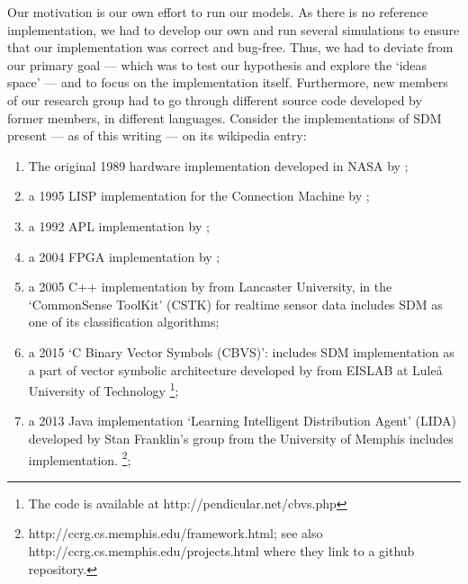 Our motivation is our own effort to run our models. As there is no reference implementation, we had to develop our own and run several simulations to ensure that our implementation was correct and bug-free. Thus, we had to deviate from our primary goal --- which was to test our hypothesis and explore the `ideas space' --- and to focus on the implementation itself. Furthermore, new members of our research group had to go through different source code developed by former members, in different languages.  Consider the implementations of SDM present --- as of this writing --- on its wikipedia entry\citep{noauthor_sparse_2018}:

\begin{enumerate}
    \item The original 1989 hardware implementation developed in NASA by \citet{flynn_sparse_1989};

    \item a 1995 LISP implementation for the Connection Machine by \citet{turk_kanervas_1995};

    \item a 1992 APL implementation by \citet{surkan_wsdm:_1992};

    \item a 2004 FPGA implementation by \citet{silva_reconfigurable_2004};

    \item a 2005 C++ implementation by \citet{berchtold_processing_2005} from Lancaster University, in the `CommonSense ToolKit' (CSTK) \citep{noauthor_cstk:_nodate} for realtime sensor data includes SDM as one of its classification algorithms;

    \item  a 2015 `C Binary Vector Symbols (CBVS)':  includes SDM implementation as a part of  vector symbolic architecture developed by \citet{emruli_vector_2015} from EISLAB at Luleå University of Technology \footnote{The code is available at http://pendicular.net/cbvs.php};

    \item a 2013 Java implementation `Learning Intelligent Distribution Agent' (LIDA) developed by \citep{franklin_lida:_2014, snaider_integer_2013, snaider_modular_2014} Stan Franklin's group from the University of Memphis includes implementation. \footnote{http://ccrg.cs.memphis.edu/framework.html; see also http://ccrg.cs.memphis.edu/projects.html where they link to a github repository.};

\end{enumerate}

